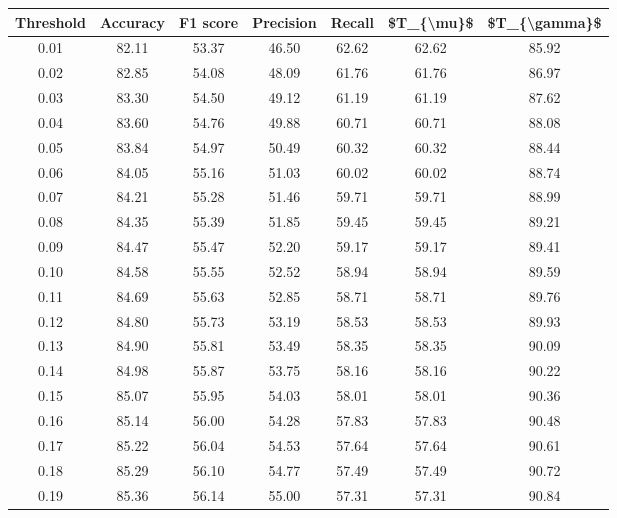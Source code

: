 \begin{tabular}{|c|c|c|c|c|c|c|}
\hline
 Threshold &  Accuracy &  F1 score &  Precision &  Recall &  \$T\_\{\textbackslash mu\}\$ &  \$T\_\{\textbackslash gamma\}\$ \\
\hline
      0.01 &     82.11 &     53.37 &      46.50 &   62.62 &      62.62 &         85.92 \\
      0.02 &     82.85 &     54.08 &      48.09 &   61.76 &      61.76 &         86.97 \\
      0.03 &     83.30 &     54.50 &      49.12 &   61.19 &      61.19 &         87.62 \\
      0.04 &     83.60 &     54.76 &      49.88 &   60.71 &      60.71 &         88.08 \\
      0.05 &     83.84 &     54.97 &      50.49 &   60.32 &      60.32 &         88.44 \\
      0.06 &     84.05 &     55.16 &      51.03 &   60.02 &      60.02 &         88.74 \\
      0.07 &     84.21 &     55.28 &      51.46 &   59.71 &      59.71 &         88.99 \\
      0.08 &     84.35 &     55.39 &      51.85 &   59.45 &      59.45 &         89.21 \\
      0.09 &     84.47 &     55.47 &      52.20 &   59.17 &      59.17 &         89.41 \\
      0.10 &     84.58 &     55.55 &      52.52 &   58.94 &      58.94 &         89.59 \\
      0.11 &     84.69 &     55.63 &      52.85 &   58.71 &      58.71 &         89.76 \\
      0.12 &     84.80 &     55.73 &      53.19 &   58.53 &      58.53 &         89.93 \\
      0.13 &     84.90 &     55.81 &      53.49 &   58.35 &      58.35 &         90.09 \\
      0.14 &     84.98 &     55.87 &      53.75 &   58.16 &      58.16 &         90.22 \\
      0.15 &     85.07 &     55.95 &      54.03 &   58.01 &      58.01 &         90.36 \\
      0.16 &     85.14 &     56.00 &      54.28 &   57.83 &      57.83 &         90.48 \\
      0.17 &     85.22 &     56.04 &      54.53 &   57.64 &      57.64 &         90.61 \\
      0.18 &     85.29 &     56.10 &      54.77 &   57.49 &      57.49 &         90.72 \\
      0.19 &     85.36 &     56.14 &      55.00 &   57.31 &      57.31 &         90.84 \\

\end{tabular}
